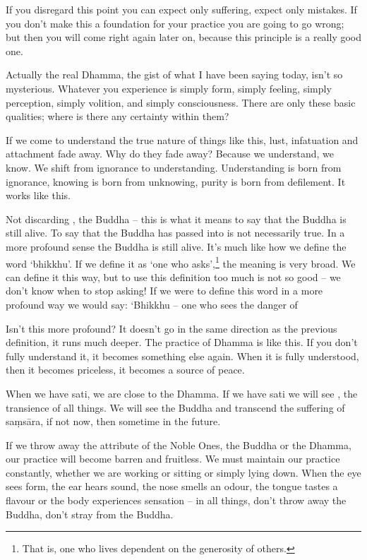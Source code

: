 If you disregard this point you can expect only suffering, expect only mistakes. If you don't make this a foundation for your practice you are going to go wrong; but then you will come right again later on, because this principle is a really good one. 

Actually the real Dhamma, the gist of what I have been saying today, isn't so mysterious. Whatever you experience is simply form, simply feeling, simply perception, simply volition, and simply consciousness. There are only these basic qualities; where is there any certainty within them? 

If we come to understand the true nature of things like this, lust, infatuation and attachment fade away. Why do they fade away? Because we understand, we know. We shift from ignorance to understanding. Understanding is born from ignorance, knowing is born from unknowing, purity is born from defilement. It works like this. 

Not discarding , the Buddha -- this is what it means to say that the Buddha is still alive. To say that the Buddha has passed into  is not necessarily true. In a more profound sense the Buddha is still alive. It's much like how we define the word `bhikkhu'. If we define it as `one who asks',\footnote{That is, one who lives dependent on the generosity of others.} the meaning is very broad. We can define it this way, but to use this definition too much is not so good -- we don't know when to stop asking! If we were to define this word in a more profound way we would say: `Bhikkhu -- one who sees the danger of  

Isn't this more profound? It doesn't go in the same direction as the previous definition, it runs much deeper. The practice of Dhamma is like this. If you don't fully understand it, it becomes something else again. When it is fully understood, then it becomes priceless, it becomes a source of peace.

When we have sati, we are close to the Dhamma. If we have sati we will see , the transience of all things. We will see the Buddha and transcend the suffering of sa\d{m}s\=ara, if not now, then sometime in the future. 

If we throw away the attribute of the Noble Ones, the Buddha or the Dhamma, our practice will become barren and fruitless. We must maintain our practice constantly, whether we are working or sitting or simply lying down. When the eye sees form, the ear hears sound, the nose smells an odour, the tongue tastes a flavour or the body experiences sensation -- in all things, don't throw away the Buddha, don't stray from the Buddha. 

